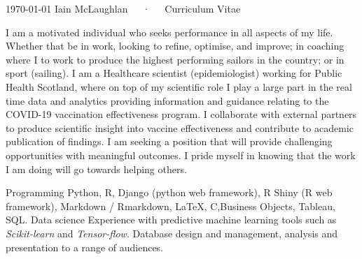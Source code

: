 \documentclass[11pt, a4paper]{awesome-cv}
\begin{document}
\makecvheader
\makecvfooter
  {\today}
  {Iain McLaughlan~~~·~~~Curriculum Vitae}
  {\thepage}

\begin{cvparagraph}
I am a motivated individual who seeks performance in all aspects of my life. Whether that be in work, looking to refine, optimise, and improve; in coaching where I to work to produce the highest performing sailors in the country; or in sport (sailing).\newline
I am a Healthcare scientist (epidemiologist) working for Public Health Scotland, where on top of my scientific role I play a large part in the real time data and analytics providing information and guidance relating to the COVID-19 vaccination effectiveness program. I collaborate with external partners to produce scientific insight into vaccine effectiveness and contribute to academic publication of findings.\newline
I am seeking a position that will provide challenging opportunities with meaningful outcomes. I pride myself in knowing that the work I am doing will go towards helping others.  
\end{cvparagraph}


\begin{cvskills}
  \cvskill
    {Programming} %
    {Python, R, Django (python web framework), R Shiny (R web framework), Markdown / Rmarkdown, LaTeX, C,\newline Business Objects, Tableau, SQL.} %
  \cvskill
    {Data science}
    {Experience with predictive machine learning tools such as \textit{Scikit-learn} and \textit{Tensor-flow}. Database design and management, analysis and presentation to a range of audiences.}

\end{cvskills}




\end{document}
